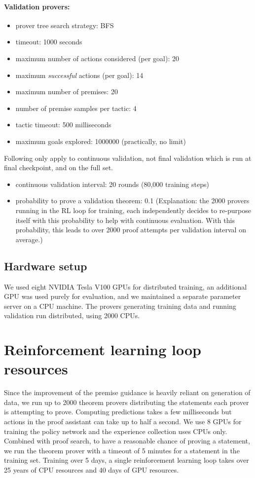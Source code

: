 \documentclass{article}
\begin{document}
\paragraph{Validation provers:}
\begin{itemize}
    \item prover tree search strategy: BFS
    \item timeout: 1000 seconds
    \item maximum number of actions considered (per goal): 20 
    \item maximum \emph{successful} actions (per goal): 14
    \item maximum number of premises: 20
    \item number of premise samples per tactic: 4
    \item tactic timeout: 500 milliseconds
    \item maximum goals explored: 1000000 (practically, no limit)
\end{itemize}
Following only apply to continuous validation, not final validation which is run at final checkpoint, and on the full set.
\begin{itemize}
    \item continuous validation interval: 20 rounds (80,000 training steps)
    \item probability to prove a validation theorem: 0.1 (Explanation: the 2000 provers running in the RL loop for training, each independently decides to re-purpose itself with this probability to help with continuous evaluation. With this probability, this leads to over 2000 proof attempts per validation interval on average.)
\end{itemize}

\subsection{Hardware setup}
We used eight NVIDIA Tesla V100 GPUs for distributed training, an additional GPU was used purely for
evaluation, and we maintained a separate parameter server on a CPU machine.
The provers generating training data and running validation run distributed, using 2000 CPUs.

\section{Reinforcement learning loop resources}
\label{apx:loopresources}
Since the improvement of the premise guidance is heavily reliant on generation of data, we run up to 2000 theorem provers distributing the statements each prover is attempting to prove.
Computing predictions takes a few milliseconds but actions in the proof assistant can take up to half a second. We use 8 GPUs for training the policy network and the experience collection uses CPUs only.
Combined with proof search, to have a reasonable chance of proving a statement, we run the theorem prover with a timeout of 5 minutes for
a statement in the training set.
Training over 5 days, a single reinforcement learning loop takes over 25 years of CPU resources and 40 days of GPU resources.
 
\end{document}
